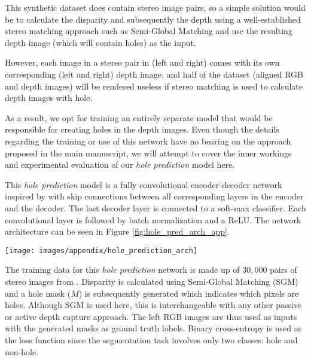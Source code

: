 \documentclass[10pt,twocolumn,letterpaper]{article}
\begin{document}
{This synthetic dataset \cite{RosCVPR16} does contain stereo image pairs, so a simple solution would be to calculate the disparity and subsequently the depth using a well-established stereo matching approach such as Semi-Global Matching \cite{hirschmuller2008stereo} and use the resulting depth image (which will contain holes) as the input.

However, each image in a stereo pair in \cite{RosCVPR16} (left and right) comes with its own corresponding (left and right) depth image, and half of the dataset (aligned RGB and depth images) will be rendered useless if stereo matching is used to calculate depth images with hole.

As a result, we opt for training an entirely separate model that would be responsible for creating holes in the depth images. Even though the details regarding the training or use of this network have no bearing on the approach proposed in the main manuscript, we will attempt to cover the inner workings and experimental evaluation of our \textit{hole prediction} model here.

This \textit{hole prediction} model is a fully convolutional encoder-decoder network inspired by \cite{ronneberger2015u} with skip connections between all corresponding layers in the encoder and the decoder. The last decoder layer is connected to a soft-max classifier. Each convolutional layer is followed by batch normalization \cite{ioffe2015batch} and a ReLU. The network architecture can be seen in Figure \ref{fig:hole_pred_arch_app}.

\begin{figure*}[b!]
	\centering
	\texttt{[image: images/appendix/hole\_prediction\_arch]}
	\captionsetup[figure]{skip=7pt}
	\label{fig:hole_pred_arch_app}\vspace{-0.4cm}
\end{figure*}


The training data for this \textit{hole prediction} network is made up of $30,000$ pairs of stereo images from \cite{Geiger2013IJRR}. Disparity is calculated using Semi-Global Matching (SGM) \cite{hirschmuller2008stereo} and a hole mask ($M$) is subsequently generated which indicates which pixels are holes. Although SGM is used here, this is interchangeable with any other passive or active depth capture approach. The left RGB images are thus used as inputs with the generated masks as ground truth labels. Binary cross-entropy is used as the loss function since the segmentation task involves only two classes: hole and non-hole.

}
\end{document}
